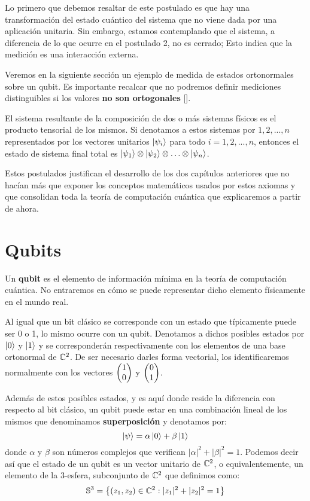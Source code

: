 Lo primero que debemos resaltar de este postulado es que hay una transformación del estado cuántico del sistema que no viene dada por una aplicación unitaria. Sin embargo, estamos contemplando que el sistema, a diferencia de lo que ocurre en el postulado 2,  no es cerrado; Esto indica que la medición es una interacción externa.

Veremos en la siguiente sección un ejemplo de medida de estados ortonormales sobre un qubit. Es importante recalcar que no podremos definir mediciones distinguibles si los valores \textbf{no son ortogonales} [\cite[p.~87]{nielsen2001quantum}]. 

\begin{postulate} El sistema resultante de la composición de dos o más sistemas físicos es el producto tensorial de los mismos. Si denotamos a estos sistemas por $1,2,...,n$ representados por los vectores unitarios $\left|\psi_i\right\rangle$ para todo $i=1,2,...,n$, entonces el estado de sistema final total es $\left|\psi_1\right\rangle\otimes\left|\psi_2\right\rangle\otimes\hdots\otimes\left|\psi_n\right\rangle$.

Estos postulados justifican el desarrollo de los dos capítulos anteriores que no hacían más que exponer los conceptos matemáticos usados por estos axiomas y que consolidan toda la teoría de computación cuántica que explicaremos a partir de ahora.
\end{postulate}

\section{Qubits}

Un \textbf{qubit}  es el elemento de información mínima en la teoría de computación cuántica. No entraremos en cómo se puede representar dicho elemento físicamente en el mundo real.

Al igual que un bit clásico se corresponde con un estado que típicamente puede ser 0 o 1, lo mismo ocurre con un qubit. Denotamos a dichos posibles estados por $\left|0\right\rangle$ y $\left|1\right\rangle$ y se corresponderán respectivamente con los elementos de una base ortonormal de $\mathbb{C}^2$. De ser necesario darles forma vectorial, los identificaremos normalmente con los vectores $\begin{pmatrix} 1 \\ 0 \end{pmatrix}$ y $\begin{pmatrix} 0 \\ 1 \end{pmatrix}$.

Además de estos posibles estados, y es aquí donde reside la diferencia con respecto al bit clásico, un qubit puede estar en una combinación lineal de los mismos que denominamos \textbf{superposición} y denotamos por:
\begin{equation}\left|\psi\right\rangle=\alpha\left|0\right\rangle+\beta\left|1\right\rangle
\end{equation}
donde $\alpha$ y $\beta$ son números complejos que verifican $|\alpha|^2+|\beta|^2=1$. Podemos decir así que el estado de un qubit es un vector unitario de $\mathbb{C}^2$, o equivalentemente, un elemento de la 3-esfera, subconjunto de $\mathbb{C}^2$ que definimos como:
\begin{equation}\mathbb{S}^3=\left\{ (z_1,z_2)\in\mathbb{C}^2:|z_1|^2+|z_2|^2=1 \right\}
\end{equation}

